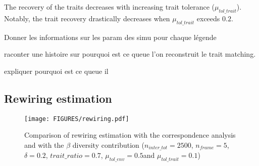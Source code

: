 The recovery of the traits decreases with increasing trait tolerance ($\mu_{tol\_trait}$). Notably, the trait recovery drastically decreases when $\mu_{tol\_trait}$ exceeds  $0.2$.















Donner les informations sur les param des simu pour chaque légende

raconter une histoire sur pourquoi est ce queue l'on reconstruit le trait matching.

expliquer pourquoi est ce queue il 



\subsection{Rewiring estimation}

\begin{figure}
    \centering
    \texttt{[image: FIGURES/rewiring.pdf]}
    \caption{Comparison of rewiring estimation with the correspondence analysis and with the $\beta$ diversity contribution ($n_{inter\_tot} = 2500$, $n_{frame} = 5$, $\delta =  0.2$, $trait\_ratio = 0.7$, $\mu_{tol\_env} = 0.5$and $\mu_{tol\_trait} = 0.1$)}
    \label{fig:enter-label}
\end{figure}

